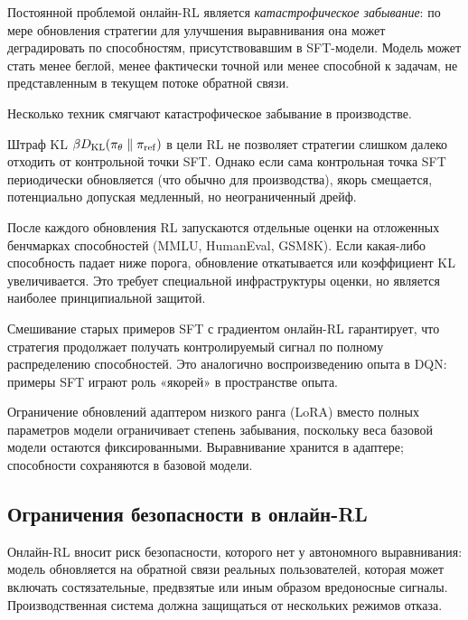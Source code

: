 Постоянной проблемой онлайн-RL является \emph{катастрофическое забывание}: по мере обновления стратегии для улучшения выравнивания она может деградировать по способностям, присутствовавшим в SFT-модели. Модель может стать менее беглой, менее фактически точной или менее способной к задачам, не представленным в текущем потоке обратной связи.

Несколько техник смягчают катастрофическое забывание в производстве.

\begin{description}[leftmargin=!,labelwidth=3.5cm]
  \item[Якорение KL] Штраф KL $\beta D_{\mathrm{KL}}\!\left(\pi_\theta\;\|\;\pi_\mathrm{ref}\right)$ в цели RL не позволяет стратегии слишком далеко отходить от контрольной точки SFT. Однако если сама контрольная точка SFT периодически обновляется (что обычно для производства), якорь смещается, потенциально допуская медленный, но неограниченный дрейф.
  \item[Ограничения на способности] После каждого обновления RL запускаются отдельные оценки на отложенных бенчмарках способностей (MMLU, HumanEval, GSM8K). Если какая-либо способность падает ниже порога, обновление откатывается или коэффициент KL увеличивается. Это требует специальной инфраструктуры оценки, но является наиболее принципиальной защитой.
  \item[Буферы воспроизведения] Смешивание старых примеров SFT с градиентом онлайн-RL гарантирует, что стратегия продолжает получать контролируемый сигнал по полному распределению способностей. Это аналогично воспроизведению опыта в DQN: примеры SFT играют роль «якорей» в пространстве опыта.
  \item[Дообучение на основе LoRA] Ограничение обновлений адаптером низкого ранга (LoRA) вместо полных параметров модели ограничивает степень забывания, поскольку веса базовой модели остаются фиксированными. Выравнивание хранится в адаптере; способности сохраняются в базовой модели.
\end{description}

\subsection{Ограничения безопасности в онлайн-RL}

Онлайн-RL вносит риск безопасности, которого нет у автономного выравнивания: модель обновляется на обратной связи реальных пользователей, которая может включать состязательные, предвзятые или иным образом вредоносные сигналы. Производственная система должна защищаться от нескольких режимов отказа.

